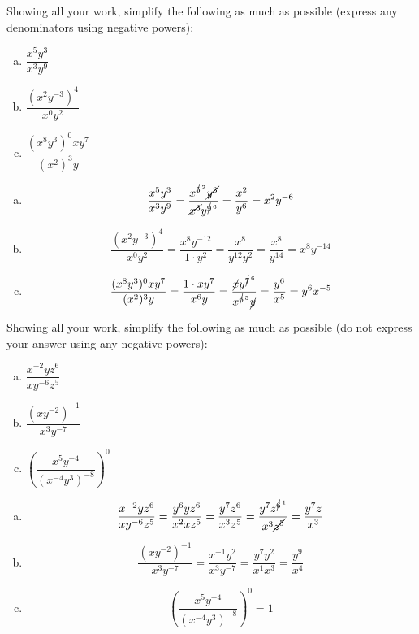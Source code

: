 \documentclass[11pt,letterpaper]{article}
\begin{document}

 Showing all your work, simplify the following as much as possible (express any denominators using negative powers):
	\begin{enumerate}[(a)]
	\item $\dfrac{x^5 y^3}{x^3 y^9}$
	\item $\dfrac{(x^2 y^{-3})^4}{x^0 y^2}$
	\item $\dfrac{(x^8 y^3)^0 x y^7}{(x^2)^3 y}$
	\end{enumerate} \pspace

\sol 
\begin{enumerate}[(a)]
\item 
	\[
	\dfrac{x^5 y^3}{x^3 y^9}= \dfrac{x^{\cancel{5}^{\,2}} \cancel{y^3}}{\cancel{x^3} y^{\cancel{9}^{\,6}}}= \dfrac{x^2}{y^6}= x^2 y^{-6}
	\] \pspace

\item 
	\[
	\dfrac{(x^2 y^{-3})^4}{x^0 y^2}= \dfrac{x^8 y^{-12}}{1 \cdot y^2}= \dfrac{x^8}{y^{12} y^2}= \dfrac{x^8}{y^{14}}= x^8 y^{-14}
	\] \pspace

\item 
	\[
	\dfrac{(x^8 y^3)^0 x y^7}{(x^2)^3 y}= \dfrac{1 \cdot x y^7}{x^6 y}= \dfrac{\cancel{x} y^{\cancel{7}^{\,6}}}{x^{\cancel{6}^{\,5}} \cancel{y}}= \dfrac{y^6}{x^5}= y^6 x^{-5}
	\]
\end{enumerate}



\newpage



 Showing all your work, simplify the following as much as possible (do not express your answer using any negative powers): 
	\begin{enumerate}[(a)]
	\item $\dfrac{x^{-2} y z^6}{x y^{-6} z^5}$
	\item $\dfrac{(x y^{-2})^{-1}}{x^3 y^{-7}}$
	\item $\left( \dfrac{x^5 y^{-4}}{(x^{-4} y^3)^{-8}} \right)^0$
	\end{enumerate} \pspace

\sol 
\begin{enumerate}[(a)]
\item 
	\[
	\dfrac{x^{-2} y z^6}{x y^{-6} z^5}= \dfrac{y^6 y z^6}{x^2 x z^5}= \dfrac{y^7 z^6}{x^3 z^5}= \dfrac{y^7 z^{\cancel{6}^{\,1}}}{x^3 \cancel{z^5}}= \dfrac{y^7 z}{x^3}
	\] \pspace

\item 
	\[
	\dfrac{(x y^{-2})^{-1}}{x^3 y^{-7}}= \dfrac{x^{-1} y^2}{x^3 y^{-7}}= \dfrac{y^7 y^2}{x^1 x^3}= \dfrac{y^9}{x^4}
	\] \pspace

\item 
	\[
	\left( \dfrac{x^5 y^{-4}}{(x^{-4} y^3)^{-8}} \right)^0= 1
	\]
\end{enumerate}
\end{document}
